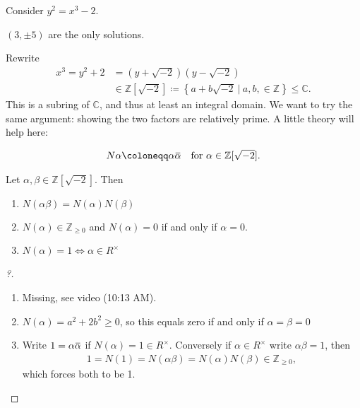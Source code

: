\begin{example}[Fermat]

Consider \(y^2 = x^3-2\).

\begin{claim}

\((3, \pm 5)\) are the only solutions.

\end{claim}

Rewrite
\begin{align*}
x^3 = y^2+2 &= (y+ \sqrt{-2})(y - \sqrt{-2}) \\ 
&\in
{\mathbb{Z}}[\sqrt{-2}] \coloneqq\left\{{a+b\sqrt{-2} {~\mathrel{\Big|}~}a,b,\in {\mathbb{Z}}}\right\} \leq {\mathbb{C}}
.\end{align*}
This is a subring of \({\mathbb{C}}\), and thus at least an integral
domain. We want to try the same argument: showing the two factors are
relatively prime. A little theory will help here:

\begin{definition}

\begin{align*}
N \alpha \coloneqq\alpha\mkern 1.5mu\overline{\mkern-1.5mu\alpha \mkern-1.5mu}\mkern 1.5mu&& \text{for } \alpha\in {\mathbb{Z}}[ \sqrt{-2} ]
.\end{align*}

\end{definition}

\begin{lemma}[?]

Let \(\alpha, \beta \in {\mathbb{Z}}[\sqrt{-2}]\). Then

\begin{enumerate}
\def\labelenumi{\arabic{enumi}.}
\item
  \(N(\alpha \beta) = N(\alpha) N(\beta)\)
\item
  \(N( \alpha) \in {\mathbb{Z}}_{\geq 0}\) and \(N(\alpha) = 0\) if and
  only if \(\alpha= 0\).
\item
  \(N(\alpha) = 1 \iff \alpha\in R^{\times}\)
\end{enumerate}

\end{lemma}

\begin{proof}[?]

\begin{enumerate}
\def\labelenumi{\arabic{enumi}.}
\item
  Missing, see video (10:13 AM).
\item
  \(N(\alpha) = a^2 + 2b^2 \geq 0\), so this equals zero if and only if
  \(\alpha= \beta= 0\)
\item
  Write
  \(1 = \alpha\mkern 1.5mu\overline{\mkern-1.5mu\alpha\mkern-1.5mu}\mkern 1.5mu\)
  if \(N(\alpha) = 1 \in R^{\times}\). Conversely if
  \(\alpha\in R^{\times}\) write \(\alpha \beta = 1\), then
  \begin{align*} 
  1 = N(1) = N(\alpha \beta) = N(\alpha ) N(\beta ) \in {\mathbb{Z}}_{\geq 0} 
  ,\end{align*}
  which forces both to be 1.
\end{enumerate}


\end{proof}
\end{example}
